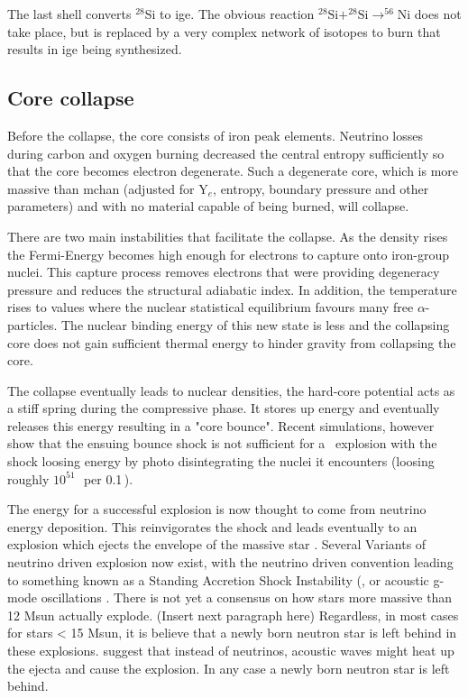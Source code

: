 The last shell converts $^{28}$Si to \gls{ige}. The obvious reaction $^{28}\textrm{Si}+^{28}\textrm{Si}\rightarrow^{56}\textrm{Ni}$ does not take place, but is replaced by a very complex network of isotopes to burn that results in \gls{ige} being synthesized.

\subsection{Core collapse} Before the collapse,  the core consists of iron peak elements. Neutrino losses during carbon and oxygen burning decreased the central entropy sufficiently so that the core becomes electron degenerate. Such a degenerate core, which is more massive than \gls{mchan} (adjusted for Y$_e$, entropy, boundary pressure and other parameters) and with no material capable of being burned, will collapse. 

There are two main instabilities that facilitate the collapse. As the density rises the Fermi-Energy becomes high enough for electrons to capture onto iron-group nuclei. This capture process removes electrons that were providing degeneracy pressure and reduces the structural adiabatic index. In addition, the temperature rises to values where the nuclear statistical equilibrium favours many free $\alpha$-particles. The nuclear binding energy of this new state is less and the collapsing core does not gain sufficient thermal energy to hinder gravity from collapsing the core.

The collapse eventually leads to nuclear densities, the hard-core potential acts as a stiff spring during the compressive phase. It stores up energy and eventually releases this energy resulting in a "core bounce".  Recent simulations, however show that the ensuing bounce shock is not sufficient for a \snii\ explosion with the shock loosing energy by photo disintegrating the nuclei it encounters (loosing roughly $10^{51}$\,\erg\ per 0.1\,\msun).

The energy for a successful explosion is now thought to come from neutrino energy deposition. This reinvigorates the shock and leads eventually to an explosion which ejects the envelope of the massive star \citep{1994ApJ...435..339H}. Several Variants of neutrino driven explosion now exist, with the neutrino driven convention leading to something known as a Standing Accretion Shock Instability (\citep[SASI - ][]{2006ApJ...642..401B}, or acoustic g-mode oscillations \citep{2007ApJ...655..416B} . There is not yet a consensus on how stars more massive than 12 Msun actually explode. (Insert next paragraph here) Regardless, in most cases for stars < 15 Msun, it is believe that a newly born neutron star is left behind in these explosions. suggest that instead of neutrinos, acoustic waves might heat up the ejecta and cause the explosion. In any case a newly born neutron star is left behind.

